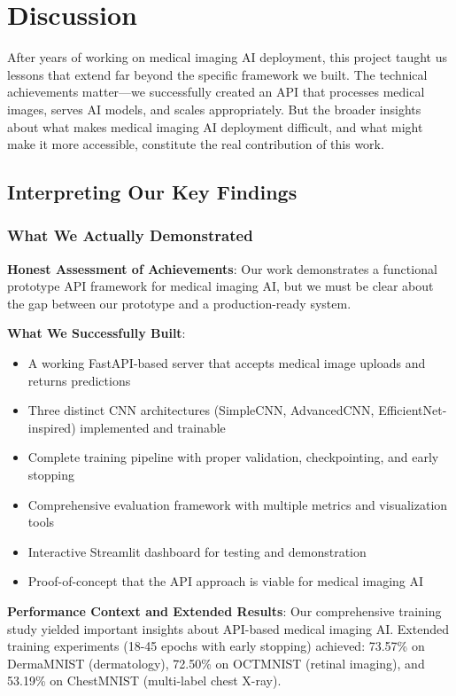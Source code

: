 \documentclass[12pt,a4paper]{article}
\begin{document}
\section{Discussion}

After years of working on medical imaging AI deployment, this project taught us lessons that extend far beyond the specific framework we built. The technical achievements matter—we successfully created an API that processes medical images, serves AI models, and scales appropriately. But the broader insights about what makes medical imaging AI deployment difficult, and what might make it more accessible, constitute the real contribution of this work.

\subsection{Interpreting Our Key Findings}

\subsubsection{What We Actually Demonstrated}

\textbf{Honest Assessment of Achievements}: Our work demonstrates a functional prototype API framework for medical imaging AI, but we must be clear about the gap between our prototype and a production-ready system.

\textbf{What We Successfully Built}:
\begin{itemize}
    \item A working FastAPI-based server that accepts medical image uploads and returns predictions
    \item Three distinct CNN architectures (SimpleCNN, AdvancedCNN, EfficientNet-inspired) implemented and trainable
    \item Complete training pipeline with proper validation, checkpointing, and early stopping
    \item Comprehensive evaluation framework with multiple metrics and visualization tools
    \item Interactive Streamlit dashboard for testing and demonstration
    \item Proof-of-concept that the API approach is viable for medical imaging AI
\end{itemize}

\textbf{Performance Context and Extended Results}: Our comprehensive training study yielded important insights about API-based medical imaging AI. Extended training experiments (18-45 epochs with early stopping) achieved: 73.57\% on DermaMNIST (dermatology), 72.50\% on OCTMNIST (retinal imaging), and 53.19\% on ChestMNIST (multi-label chest X-ray). 
\end{document}
